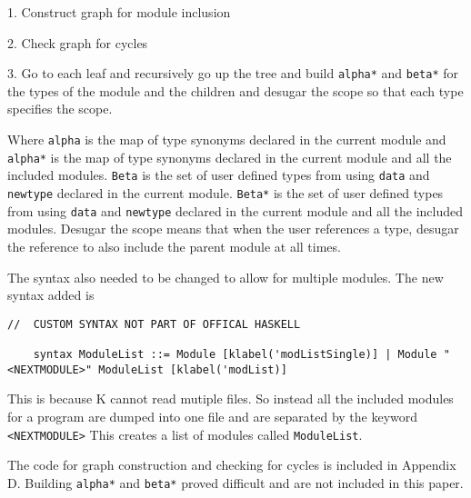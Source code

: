 1. Construct graph for module inclusion

2. Check graph for cycles

3. Go to each leaf and recursively go up the tree and build \texttt{alpha*} and \texttt{beta*} for the types of the module and the children and desugar the scope so that each type specifies the scope.

Where \texttt{alpha} is the map of type synonyms declared in the current module and \texttt{alpha*} is the map of type synonyms declared in the current module and all the included modules. \texttt{Beta} is the set of user defined types from using \texttt{data} and \texttt{newtype} declared in the current module. \texttt{Beta*} is the set of user defined types from using \texttt{data} and \texttt{newtype} declared in the current module and all the included modules. 
Desugar the scope means that when the user references a type, desugar the reference to also include the parent module at all times.

The syntax also needed to be changed to allow for multiple modules. The new syntax added is

\begin{lstlisting}
//  CUSTOM SYNTAX NOT PART OF OFFICAL HASKELL

    syntax ModuleList ::= Module [klabel('modListSingle)] | Module "<NEXTMODULE>" ModuleList [klabel('modList)]
\end{lstlisting}

This is because K cannot read mutiple files. So instead all the included modules for a program are dumped into one file and are separated by the keyword \texttt{<NEXTMODULE>}
This creates a list of modules called \texttt{ModuleList}.

The code for graph construction and checking for cycles is included in Appendix D. Building \texttt{alpha*} and \texttt{beta*} proved difficult and are not included in this paper.